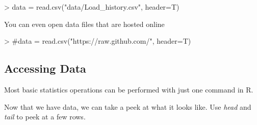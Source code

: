 \documentclass{article}
\begin{document}
\begin{Schunk}
\begin{Sinput}
> data = read.csv("data/Load_history.csv", header=T)
\end{Sinput}
\end{Schunk}

You can even open data files that are hosted online

\begin{Schunk}
\begin{Sinput}
> #data = read.csv("https://raw.github.com/", header=T)
\end{Sinput}
\end{Schunk}

\subsection{Accessing Data}

Most basic statistics operations can be performed with just one command in R.

Now that we have data, we can take a peek at what it looks like.  Use \textit{head}
and \textit{tail} to peek at a few rows.
\end{document}
